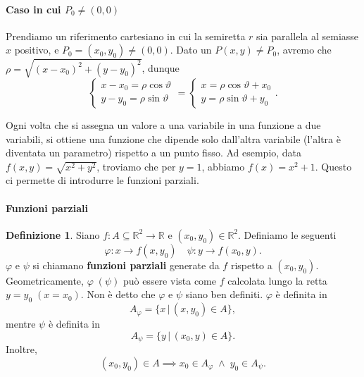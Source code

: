 \documentclass{article}
\theoremstyle{plain}
\theoremstyle{definition}
\newtheorem{defn}{Definizione}[section]
\theoremstyle{remark}
\begin{document}
\vspace{10pt}

\paragraph{Caso in cui $P_0\neq(0,0)$}
Prendiamo un riferimento cartesiano in cui la semiretta $r$ sia parallela al semiasse $x$ positivo, e $P_0=(x_0,y_0)\neq(0,0)$.
Dato un $P(x,y)\neq P_0$, avremo che $\rho=\sqrt{(x-x_0)^2+(y-y_0)^2}$, dunque 
\[\begin{cases}
        x-x_0=\rho\cos\vartheta\\
        y-y_0=\rho\sin\vartheta
    \end{cases}=\begin{cases}
        x=\rho\cos\vartheta+x_0\\
        y=\rho\sin\vartheta+y_0
    \end{cases}.\]

\vspace{10pt}

Ogni volta che si assegna un valore a una variabile in una funzione a due variabili, si ottiene una funzione che dipende solo dall'altra variabile (l'altra è diventata un parametro) rispetto a un punto fisso.
Ad esempio, data $f(x,y)=\sqrt{x^2+y^2}$, troviamo che per $y=1$, abbiamo $f(x)={x^2+1}$.
Questo ci permette di introdurre le funzioni parziali.

\vspace{10pt}

\paragraph{Funzioni parziali}
\begin{bxthm}
\begin{defn}\label{funzparz}
    Siano $f:A\subseteq\mathbb{R}^2\to\mathbb{R}$ e $(x_0,y_0)\in\mathbb{R}^2$.
    Definiamo le seguenti \[\varphi :x\to f(x,y_0)\quad\psi :y\to f(x_0,y).\]
    $\varphi$ e $\psi$ si chiamano \textbf{funzioni parziali} generate da $f$ rispetto a $(x_0,y_0)$.
    Geometricamente, $\varphi\;(\psi)$  può essere vista come $f$ calcolata lungo la retta $y=y_0\;(x=x_0)$.
    Non è detto che $\varphi$ e $\psi$ siano ben definiti.
    $\varphi$ è definita in \[A_\varphi=\{x\,|\,(x,y_0)\in A\},\] mentre $\psi$ è definita in \[A_\psi=\{y\,|\,(x_0,y)\in A\}.\]
    Inoltre, 
    \[(x_0,y_0)\in A\implies x_0\in A_\varphi\;\land\;y_0\in A_\psi.\]
\end{defn}
\end{bxthm}
\end{document}
